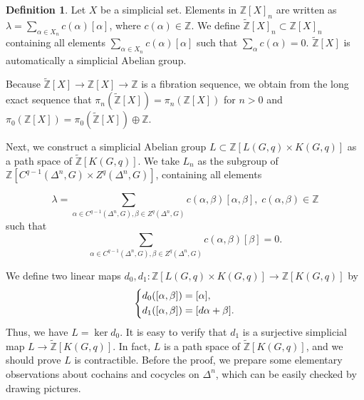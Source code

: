 \documentclass[reprint, amsmath, amssymb, showpacs, floatfix, longbibliography, aps, twocolumn, superscriptaddress, nofootinbib]{revtex4-2}
\newcommand{\ZZ}{{\mathbb Z}}
\newcommand{\tZ}{{\widetilde{\mathbb Z}}}
\theoremstyle{definition}
\newtheorem{definition}{Definition}[section]
\begin{document}
\begin{definition}
	Let $X$ be a simplicial set. Elements in $\ZZ[X]_n$ are written as $\lambda=\sum_{\alpha\in X_n}c(\alpha)[\alpha]$, where $c(\alpha)\in \ZZ$. We define $\tZ[X]_n\subset \ZZ[X]_n$ containing all elements $\sum_{\alpha\in X_n}c(\alpha)[\alpha]$ such that $\sum_\alpha c(\alpha)=0$. $\tZ[X]$ is automatically a simplicial Abelian group.
\end{definition}

Because $\tZ[X]\rightarrow \ZZ[X]\rightarrow\ZZ$ is a fibration sequence, we obtain from the long exact sequence that $\pi_n(\tZ[X])=\pi_n(\ZZ[X])$ for $n>0$ and $\pi_0(\ZZ[X])=\pi_0(\tZ[X])\oplus\ZZ$.

Next, we construct a simplicial Abelian group $L\subset \ZZ[L(G,q)\times K(G,q)]$ as a path space of $\tZ[K(G,q)]$. We take $L_n$ as the subgroup of $\ZZ[C^{q-1}(\Delta^n,G)\times Z^q(\Delta^n,G)]$, containing all elements

\begin{equation}
	\lambda=\sum_{\alpha\in C^{q-1}(\Delta^n,G),\beta\in Z^q(\Delta^n,G)}c(\alpha,\beta)[\alpha,\beta],\; c(\alpha,\beta)\in \ZZ
\end{equation}
such that 
\begin{equation}
	\sum_{\alpha\in C^{q-1}(\Delta^n,G),\beta\in Z^q(\Delta^n,G)}c(\alpha,\beta)[\beta]=0.
\end{equation}

We define two linear maps $d_0,d_1:\ZZ[L(G,q)\times K(G,q)]\rightarrow \ZZ[K(G,q)]$ by
\begin{equation}\emph{}
	\left\{
	\begin{aligned}
		d_0([\alpha,\beta]) &= [\alpha],\\
		d_1([\alpha,\beta]) &= [d\alpha+\beta].
	\end{aligned}
	\right.
\end{equation}
Thus, we have $L=\ker d_0$. It is easy to verify that $d_1$ is a surjective simplicial map $L\rightarrow \tZ[K(G,q)]$. In fact,  $L$ is a path space of $\tZ[K(G,q)]$, and we should prove $L$ is contractible. Before the proof, we prepare some elementary observations about cochains and cocycles on $\Delta^n$, which can be easily checked by drawing pictures.
\end{document}
